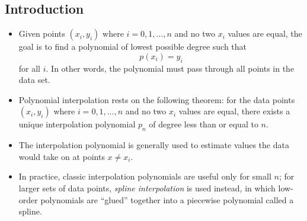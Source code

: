 \documentclass[11pt, a4paper]{article}
\begin{document}
\subsection{Introduction}
\begin{itemize}
	\item Given points $ (x_i, y_i) $ where $ i = 0, 1, \dots, n $ and no two $ x_i $ values are equal, the goal is to find a polynomial of lowest possible degree such that
	\begin{equation*}
		p(x_i) = y_i
	\end{equation*}
	for all $ i $. In other words, the polynomial must pass through all points in the data set. 
	
	\item Polynomial interpolation rests on the following theorem: for the data points $ (x_i, y_i) $ where $ i = 0, 1, \dots, n $ and no two $ x_i $ values are equal, there exists a unique interpolation polynomial $ p_{n} $ of degree less than or equal to $ n $.
	
	\item The interpolation polynomial is generally used to estimate values the data would take on at points $ x \neq x_{i} $.
	
	\item In practice, classic interpolation polynomials are useful only for small $ n $; for larger sets of data points, \textit{spline interpolation} is used instead, in which low-order polynomials are ``glued'' together into a piecewise polynomial called a spline.
\end{itemize}
\end{document}
